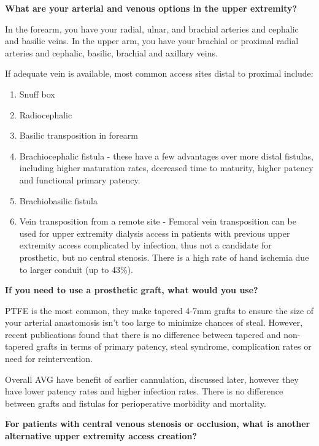 \documentclass[
]{book}
\begin{document}
\textbf{What are your arterial and venous options in the upper extremity?}

In the forearm, you have your radial, ulnar, and brachial arteries and
cephalic and basilic veins. In the upper arm, you have your brachial or
proximal radial arteries and cephalic, basilic, brachial and axillary
veins.

If adequate vein is available, most common access sites distal to
proximal include:

\begin{enumerate}
\def\labelenumi{\arabic{enumi}.}
\item
  Snuff box
\item
  Radiocephalic
\item
  Basilic transposition in forearm
\item
  Brachiocephalic fistula - these have a few advantages over more
  distal fistulas, including higher maturation rates, decreased time
  to maturity, higher patency and functional primary
  patency.\citep{nguyen2007}
\item
  Brachiobasilic fistula\citep{gilmore2006}
\item
  Vein transposition from a remote site - Femoral vein transposition
  can be used for upper extremity dialysis access in patients with
  previous upper extremity access complicated by infection, thus not a
  candidate for prosthetic, but no central stenosis. There is a high
  rate of hand ischemia due to larger conduit (up to 43\%).\citep{huber2004}
\end{enumerate}

\textbf{If you need to use a prosthetic graft, what would you use?}

PTFE is the most common, they make tapered 4-7mm grafts to ensure the
size of your arterial anastomosis isn't too large to minimize chances of
steal. However, recent publications found that there is no difference
between tapered and non-tapered grafts in terms of primary patency,
steal syndrome, complication rates or need for
reintervention.\citep{roberts2019, han2017}

Overall AVG have benefit of earlier cannulation, discussed later,
however they have lower patency rates and higher infection rates. There
is no difference between grafts and fistulas for perioperative morbidity
and mortality.\citep{macsata2019}

\textbf{For patients with central venous stenosis or occlusion, what is
another alternative upper extremity access creation?}
\end{document}
